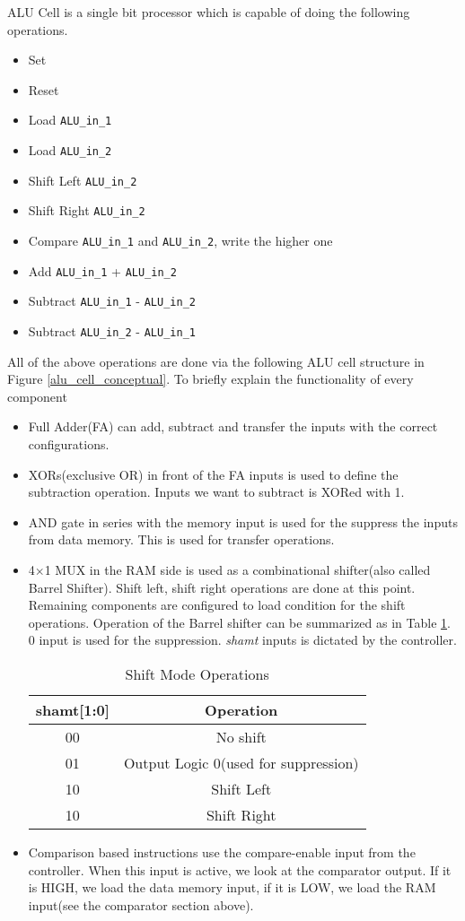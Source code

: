\documentclass[12pt]{article}
\begin{document}
ALU Cell is a single bit processor which is capable of doing the following operations.
\begin{itemize}
\item Set
\item Reset 
\item Load \verb|ALU_in_1|
\item Load \verb|ALU_in_2|
\item Shift Left \verb|ALU_in_2|
\item Shift Right \verb|ALU_in_2|
\item Compare \verb|ALU_in_1| and \verb|ALU_in_2|, write the higher one
\item Add \verb|ALU_in_1| + \verb|ALU_in_2|
\item Subtract \verb|ALU_in_1| - \verb|ALU_in_2|
\item Subtract \verb|ALU_in_2| - \verb|ALU_in_1|
\end{itemize}


All of the above operations are done via the following ALU cell structure in Figure \ref{alu_cell_conceptual}. To briefly explain the functionality of every component

\begin{itemize}
\item Full Adder(FA) can add, subtract and transfer the inputs with the correct configurations.
\item XORs(exclusive OR) in front of the FA inputs is used to define the subtraction operation. Inputs we want to subtract is XORed with 1.
\item AND gate in series with the memory input is used for the suppress the inputs from data memory. This is used for transfer operations.
\item 4$\times$1 MUX in the RAM side is used as a combinational shifter(also called Barrel Shifter). Shift left, shift right operations are done at this point. Remaining components are configured to load condition for the shift operations. Operation of the Barrel shifter can be summarized as in Table \ref{shamt}. 0 input is used for the suppression. \textsl{shamt} inputs is dictated by the controller.

\begin{table}[h]
\centering
\begin{tabular}{|c|c|}
\hline 
\textbf{shamt[1:0]} & \textbf{Operation} \\ 
\hline 
00 & No shift \\ 
\hline 
01 & Output Logic 0(used for suppression) \\ 
\hline 
10 & Shift Left \\ 
\hline 
10 & Shift Right \\ 
\hline 
\end{tabular} 
\caption{Shift Mode Operations}
\label{shamt}
\end{table}

\item Comparison based instructions use the compare-enable input from the controller. When this input is active, we look at the comparator output. If it is HIGH, we load the data memory input, if it is LOW, we load the RAM input(see the comparator section above).
\end{itemize}
\end{document}
